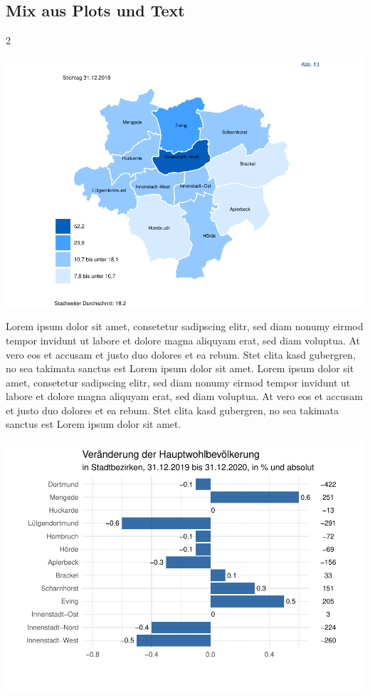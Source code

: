 \documentclass[
  a4paper,
  twoside]{article}
\begin{document}
\newpage

\hypertarget{mix-aus-plots-und-text}{%
\subsection{Mix aus Plots und Text}\label{mix-aus-plots-und-text}}

\begin {multicols}{2}

\includegraphics[width=1\linewidth]{2021-03-02_Beispiel_files/figure-latex/unnamed-chunk-2-1}

Lorem ipsum dolor sit amet, consetetur sadipscing elitr, sed diam nonumy
eirmod tempor invidunt ut labore et dolore magna aliquyam erat, sed diam
voluptua. At vero eos et accusam et justo duo dolores et ea rebum. Stet
clita kasd gubergren, no sea takimata sanctus est Lorem ipsum dolor sit
amet. Lorem ipsum dolor sit amet, consetetur sadipscing elitr, sed diam
nonumy eirmod tempor invidunt ut labore et dolore magna aliquyam erat,
sed diam voluptua. At vero eos et accusam et justo duo dolores et ea
rebum. Stet clita kasd gubergren, no sea takimata sanctus est Lorem
ipsum dolor sit amet.

\includegraphics[width=1\linewidth]{2021-03-02_Beispiel_files/figure-latex/unnamed-chunk-3-1}


\end{multicols}
\end{document}
